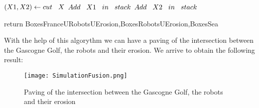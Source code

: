 \begin{algorithm}
\begin{algorithmic}
      	\vspace{0.3 cm}
          			\STATE $(X1, X2)\gets cut \hspace{0.3cm}  X$
          			\STATE $Add \hspace{0.3cm}  X1 \hspace{0.3cm}  in \hspace{0.3cm}  stack$
         			\STATE $Add \hspace{0.3cm}  X2 \hspace{0.3cm}  in \hspace{0.3cm}  stack$
         		\ENDIF
         	
  		\ENDIF
  		 \vspace{0.3 cm}
 	 \ENDWHILE 
	
	\vspace{0.3 cm}
	
  return BoxesFranceURobotsUErosion,BoxesRobotsUErosion,BoxesSea


  \end{algorithmic}
\end{algorithm}


\clearpage



\newpage

	With the help of this algorythm we can have a paving of the intersection between the Gascogne Golf, the robots and their erosion. We arrive to obtain the following result:
	

	
	\begin{figure}[!h] 
    \center
    	\texttt{[image: SimulationFusion.png]} 
    	\caption{Paving of the intersection between the Gascogne Golf, the robots and their erosion } 
    \label{S1 U S2}
	\end{figure} 
